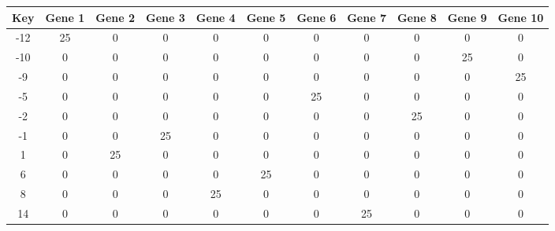 \begin{tabular}{|c|c|c|c|c|c|c|c|c|c|c|}
\hline
Key & Gene 1 & Gene 2 & Gene 3 & Gene 4 & Gene 5 & Gene 6 & Gene 7 & Gene 8 & Gene 9 & Gene 10 \\
\hline
-12 & 25 & 0 & 0 & 0 & 0 & 0 & 0 & 0 & 0 & 0 \\
-10 & 0 & 0 & 0 & 0 & 0 & 0 & 0 & 0 & 25 & 0 \\
-9 & 0 & 0 & 0 & 0 & 0 & 0 & 0 & 0 & 0 & 25 \\
-5 & 0 & 0 & 0 & 0 & 0 & 25 & 0 & 0 & 0 & 0 \\
-2 & 0 & 0 & 0 & 0 & 0 & 0 & 0 & 25 & 0 & 0 \\
-1 & 0 & 0 & 25 & 0 & 0 & 0 & 0 & 0 & 0 & 0 \\
1 & 0 & 25 & 0 & 0 & 0 & 0 & 0 & 0 & 0 & 0 \\
6 & 0 & 0 & 0 & 0 & 25 & 0 & 0 & 0 & 0 & 0 \\
8 & 0 & 0 & 0 & 25 & 0 & 0 & 0 & 0 & 0 & 0 \\
14 & 0 & 0 & 0 & 0 & 0 & 0 & 25 & 0 & 0 & 0 \\
\hline
\end{tabular}